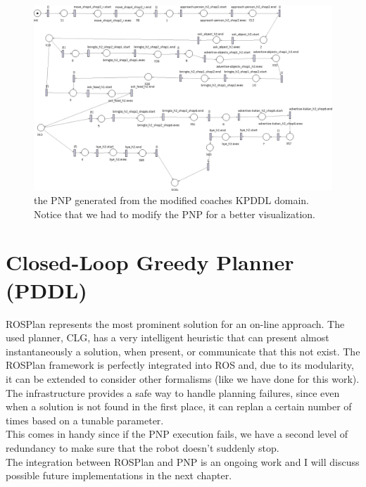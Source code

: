 \documentclass[pdftex,12pt,a4paper]{report}
\begin{document}
\newpage
\begin{figure}[H]
	\centering
	\includegraphics[scale=0.5, angle=270, trim=73mm 0mm 0mm -80mm]{images/kpddl_ex2.png}
	\caption{the PNP generated from the modified coaches KPDDL domain. Notice that we had to modify the PNP for a better visualization.}
	\label{fig:kpddl_ex2}
\end{figure}
\newpage

\section{Closed-Loop Greedy Planner (PDDL)}
\noindent ROSPlan represents the most prominent solution for an on-line approach.
The used planner, CLG, has a very intelligent heuristic that can present almost instantaneously a solution, when present, or communicate that this not exist. 
The ROSPlan framework is perfectly integrated into ROS and, due to its modularity, it can be extended to consider other formalisms (like we have done for this work).\\

\noindent The infrastructure provides a safe way to handle planning failures, since even when a solution is not found in the first place, it can replan a certain number of times based on a tunable parameter.\\
This comes in handy since if the PNP execution fails, we have a second level of redundancy to make sure that the robot doesn't suddenly stop. \\
The integration between ROSPlan and PNP is an ongoing work and I will discuss possible future implementations in the next chapter.
\end{document}
